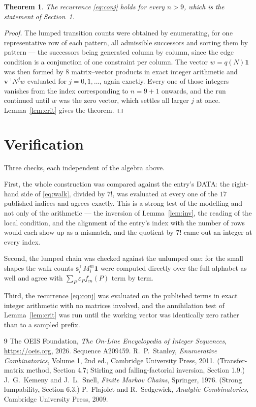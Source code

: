 \documentclass[11pt,a4paper]{article}
\theoremstyle{plain}
\newtheorem{theorem}{Theorem}
\theoremstyle{definition}
\begin{document}
\begin{theorem}
The recurrence \eqref{eq:conj} holds for every $n>9$, which is the statement of
Section~1.
\end{theorem}

\begin{proof}
The lumped transition counts were obtained by enumerating, for one representative row of
each pattern, all admissible successors and sorting them by pattern --- the successors being
generated column by column, since the edge condition is a conjunction of one constraint per
column. The vector $w=q(N)\mathbf{1}$ was then formed by $8$ matrix--vector products
in exact integer arithmetic and $\mathbf{v}^{\!\top}N^{j}w$ evaluated for
$j=0,1,\dots$, again exactly. Every one of those integers vanishes from the index
corresponding to $n=9+1$ onwards, and the run continued until $w$ was the zero vector,
which settles all larger $j$ at once. Lemma~\ref{lem:crit} gives the theorem.
\end{proof}

\section{Verification}

Three checks, each independent of the algebra above.

First, the whole construction was compared against the entry's DATA: the right-hand side of
\eqref{eq:walk}, divided by $7!$, was evaluated at every one of the $17$
published indices and agrees exactly. This is a strong test of the modelling and not only of
the arithmetic --- the inversion of Lemma~\ref{lem:inv}, the reading of the local
condition, and the alignment of the entry's index with the number of rows would each
show up as a mismatch, and the quotient by $7!$ came out an integer at every index.

Second, the lumped chain was checked against the unlumped one: for the small shapes the walk
counts $\mathbf{s}_i^{\!\top}M_i^{m}\mathbf{1}$ were computed directly over the full
alphabet as well and agree with $\sum_P\varepsilon_Pf_m(P)$ term by term.

Third, the recurrence \eqref{eq:conj} was evaluated on the published terms in exact integer
arithmetic with no matrices involved, and the annihilation test of Lemma~\ref{lem:crit} was
run until the working vector was identically zero rather than to a sampled prefix.

\begin{thebibliography}{9}
 The OEIS Foundation, \emph{The On-Line Encyclopedia of Integer
Sequences}, \url{https://oeis.org}, 2026. Sequence A209459.
 R.~P.~Stanley, \emph{Enumerative Combinatorics}, Volume 1, 2nd ed.,
Cambridge University Press, 2011. (Transfer-matrix method, Section 4.7; Stirling and
falling-factorial inversion, Section 1.9.)
 J.~G.~Kemeny and J.~L.~Snell, \emph{Finite Markov Chains}, Springer,
1976. (Strong lumpability, Section 6.3.)
 P.~Flajolet and R.~Sedgewick, \emph{Analytic Combinatorics}, Cambridge
University Press, 2009.
\end{thebibliography}
\end{document}
